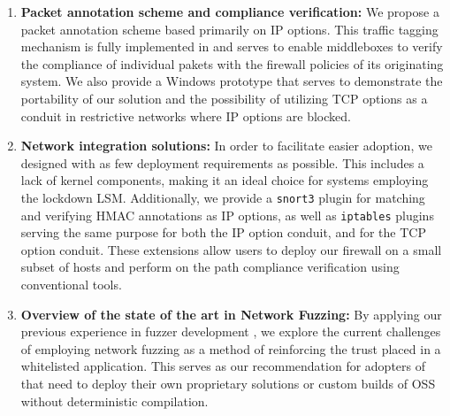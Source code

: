\begin{enumerate}
    \item \textbf{Packet annotation scheme and compliance verification:}
    We propose a packet annotation scheme based primarily on IP options. This
    traffic tagging mechanism is fully implemented in \daf{} and serves to
    enable middleboxes to verify the compliance of individual pakets with the
    firewall policies of its originating system. We also provide a Windows
    prototype \cite{gherghita2024label} that serves to demonstrate the
    portability of our solution and the possibility of utilizing TCP options as
    a conduit in restrictive networks where IP options are blocked.

    \item \textbf{Network integration solutions:} In order to facilitate easier
    adoption, we designed \daf{} with as few deployment requirements as
    possible. This includes a lack of kernel components, making it an ideal
    choice for systems employing the lockdown LSM. Additionally, we provide
    a \texttt{snort3} plugin for matching and verifying HMAC annotations as
    IP options, as well as \texttt{iptables} plugins serving the same purpose
    for both the IP option conduit, and for the TCP option conduit. These
    extensions allow users to deploy our firewall on a small subset of hosts and
    perform on the path compliance verification using conventional tools.

    \item \textbf{Overview of the state of the art in Network Fuzzing:}
    By applying our previous experience in fuzzer development \cite{nikolic2021refined},
    we explore the current challenges of employing network fuzzing
    \cite{mantu2023network} as a method of reinforcing the trust placed in a
    whitelisted application. This serves as our recommendation for adopters of
    \daf{} that need to deploy their own proprietary solutions or custom builds
    of OSS without deterministic compilation.
\end{enumerate}
